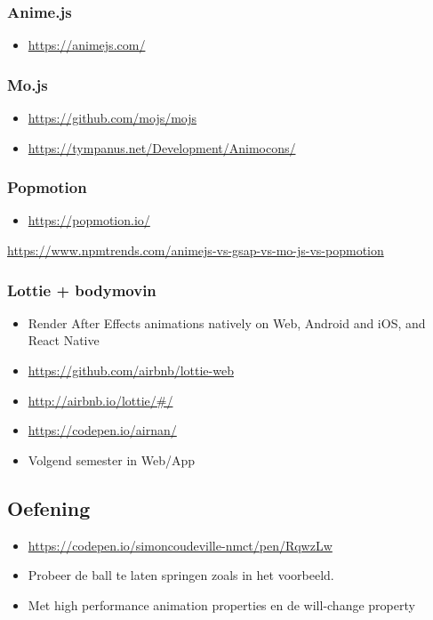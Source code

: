 \documentclass{article}
\begin{document}
\subsubsection{Anime.js}

\begin{itemize}
    \item \url{https://animejs.com/}
\end{itemize}

\subsubsection{Mo.js}

\begin{itemize}
    \item \url{https://github.com/mojs/mojs}
    \item \url{https://tympanus.net/Development/Animocons/}
\end{itemize}

\subsubsection{Popmotion}

\begin{itemize}
    \item \url{https://popmotion.io/}
\end{itemize}

\url{https://www.npmtrends.com/animejs-vs-gsap-vs-mo-js-vs-popmotion}

\subsubsection{Lottie + bodymovin}

\begin{itemize}
    \item Render After Effects animations natively on Web, Android and iOS, and React Native
    \item \url{https://github.com/airbnb/lottie-web}
    \item \url{http://airbnb.io/lottie/#/}
    \item \url{https://codepen.io/airnan/}
    \item Volgend semester in Web/App
\end{itemize}

\subsection{Oefening}

\begin{itemize}
    \item \url{https://codepen.io/simoncoudeville-nmct/pen/RqwzLw}
    \item Probeer de ball te laten springen zoals in het voorbeeld.
    \item Met high performance animation properties en de will-change property
\end{itemize}
\end{document}
